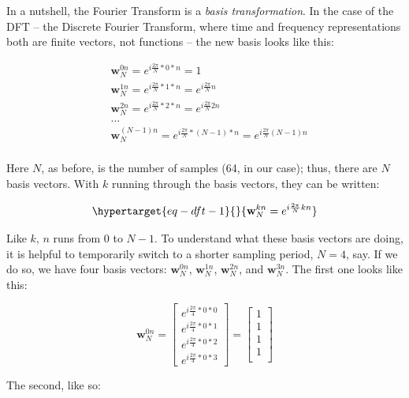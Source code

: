 \documentclass[
  letterpaper,
]{krantz}
\begin{document}
In a nutshell, the Fourier Transform is a \emph{basis
transformation}. In
the case of the DFT -- the Discrete Fourier Transform, where time and
frequency representations both are finite vectors, not functions -- the
new basis looks like this:

\[
\begin{aligned}
&\mathbf{w}^{0n}_N = e^{i\frac{2 \pi}{N}* 0 * n} = 1\\
&\mathbf{w}^{1n}_N = e^{i\frac{2 \pi}{N}* 1 * n} = e^{i\frac{2 \pi}{N} n}\\
&\mathbf{w}^{2n}_N = e^{i\frac{2 \pi}{N}* 2 * n} = e^{i\frac{2 \pi}{N}2n}\\& ... \\
&\mathbf{w}^{(N-1)n}_N = e^{i\frac{2 \pi}{N}* (N-1) * n} = e^{i\frac{2 \pi}{N}(N-1)n}\\
\end{aligned}
\]

Here \(N\), as before, is the number of samples (64, in our case); thus,
there are \(N\) basis vectors. With \(k\) running through the basis
vectors, they can be written:

\begin{equation}\protect\hypertarget{eq-dft-1}{}{
\mathbf{w}^{kn}_N = e^{i\frac{2 \pi}{N}k n}
}\label{eq-dft-1}\end{equation}

Like \(k\), \(n\) runs from \(0\) to \(N-1\). To understand what these
basis vectors are doing, it is helpful to temporarily switch to a
shorter sampling period, \(N = 4\), say. If we do so, we have four basis
vectors: \(\mathbf{w}^{0n}_N\), \(\mathbf{w}^{1n}_N\),
\(\mathbf{w}^{2n}_N\), and \(\mathbf{w}^{3n}_N\). The first one looks
like this:

\[
\mathbf{w}^{0n}_N
=
\begin{bmatrix}
   e^{i\frac{2 \pi}{4}* 0 * 0}\\
   e^{i\frac{2 \pi}{4}* 0 * 1}\\
   e^{i\frac{2 \pi}{4}* 0 * 2}\\
   e^{i\frac{2 \pi}{4}* 0 * 3}
\end{bmatrix}
=
\begin{bmatrix}
   1\\
   1\\
   1\\
   1\\
\end{bmatrix}
\]

The second, like so:
\end{document}
